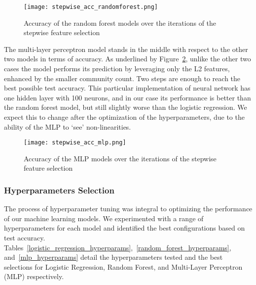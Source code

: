 \begin{figure}[h]
	\centering
	\texttt{[image: stepwise\_acc\_randomforest.png]}
	\caption{Accuracy of the random forest models over the iterations of the stepwise feature selection}\label{fig:stepwise_acc_randomforest}
\end{figure}
\noindent
The multi-layer perceptron model stands in the middle with respect to the other two models in terms of accuracy.
As underlined by Figure~\ref{fig:stepwise_acc_mlp}, unlike the other two cases the model performs its prediction by leveraging only the L2 features,
enhanced by the smaller community count. Two steps are enough to reach the best possible test accuracy.
This particular implementation of neural network has one hidden layer with 100 neurons, and in our case its performance is better
than the random forest model, but still slightly worse than the logistic regression. We expect this to change after the optimization of the hyperparameters,
due to the ability of the MLP to `see' non-linearities.

\begin{figure}[h]
	\centering
	\texttt{[image: stepwise\_acc\_mlp.png]}
	\caption{Accuracy of the MLP models over the iterations of the stepwise feature selection}\label{fig:stepwise_acc_mlp}
\end{figure}


\subsubsection*{Hyperparameters Selection}

The process of hyperparameter tuning was integral to optimizing the performance of our machine learning models.
We experimented with a range of hyperparameters for each model and identified the best configurations based on test accuracy.
Tables~\ref{logistic_regression_hyperparams},~\ref{random_forest_hyperparams}, and~\ref{mlp_hyperparams} detail the hyperparameters
tested and the best selections for Logistic Regression, Random Forest, and Multi-Layer Perceptron (MLP) respectively.

